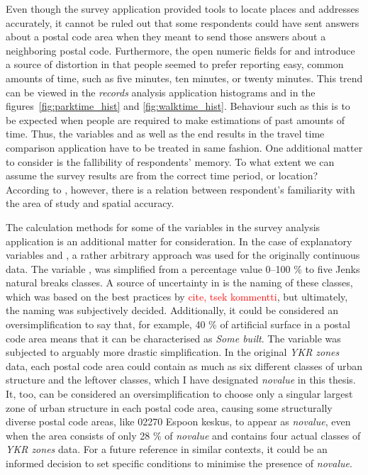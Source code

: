 Even though the survey application provided tools to locate places and addresses accurately, it cannot be ruled out that some respondents could have sent answers about a postal code area when they meant to send those answers about a neighboring postal code. Furthermore, the open numeric fields for  and  introduce a source of distortion in that people seemed to prefer reporting easy, common amounts of time, such as five minutes, ten minutes, or twenty minutes. This trend can be viewed in the \textit{records} analysis application histograms and in the figures~\ref{fig:parktime_hist} and \ref{fig:walktime_hist}. Behaviour such as this is to be expected when people are required to make estimations of past amounts of time. Thus, the variables  and  as well as the end results in the travel time comparison application have to be treated in same fashion. One additional matter to consider is the fallibility of respondents' memory. To what extent we can assume the survey results are from the correct time period, or location? According to , however, there is a relation between respondent's familiarity with the area of study and spatial accuracy. 

The calculation methods for some of the variables in the survey analysis application is an additional matter for consideration. In the case of explanatory variables  and , a rather arbitrary approach was used for the originally continuous data. The variable , was simplified from a percentage value 0--100 \% to five Jenks natural breaks classes. A source of uncertainty in  is the naming of these classes, which was based on the best practices by \textcolor{red}{cite, tsek kommentti}, but ultimately, the naming was subjectively decided. Additionally, it could be considered an oversimplification to say that, for example, 40 \% of artificial surface in a postal code area means that it can be characterised as \textit{Some built}. The variable  was subjected to arguably more drastic simplification. In the original \textit{YKR zones} data, each postal code area could contain as much as six different classes of urban structure and the leftover classes, which I have designated \textit{novalue} in this thesis. It, too, can be considered an oversimplification to choose only a singular largest zone of urban structure in each postal code area, causing some structurally diverse postal code areas, like 02270 Espoon keskus, to appear as \textit{novalue}, even when the area consists of only 28 \% of \textit{novalue} and contains four actual classes of \textit{YKR zones} data. For a future reference in similar contexts, it could be an informed decision to set specific conditions to minimise the presence of \textit{novalue}.

